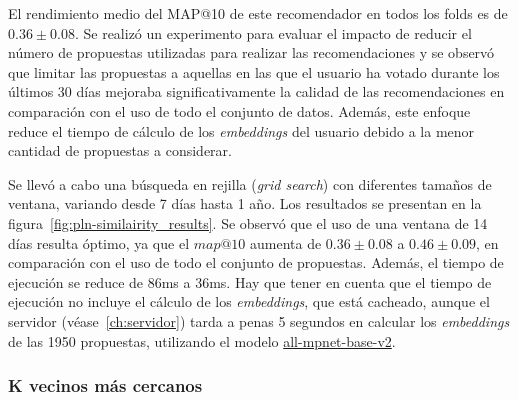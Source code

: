 El rendimiento medio del MAP@10 de este recomendador en todos los folds es de $0.36\pm 0.08$. Se realizó un experimento para evaluar el impacto de reducir el número de propuestas utilizadas para realizar las recomendaciones y se observó que limitar las propuestas a aquellas en las que el usuario ha votado durante los últimos 30 días mejoraba significativamente la calidad de las recomendaciones en comparación con el uso de todo el conjunto de datos. Además, este enfoque reduce el tiempo de cálculo de los \textit{embeddings} del usuario debido a la menor cantidad de propuestas a considerar.

Se llevó a cabo una búsqueda en rejilla (\textit{grid search}) con diferentes tamaños de ventana, variando desde 7 días hasta 1 año. Los resultados se presentan en la figura~\ref{fig:pln-similairity_results}. Se observó que el uso de una ventana de 14 días resulta óptimo, ya que el $map@10$ aumenta de $0.36\pm 0.08$ a $0.46\pm 0.09$, en comparación con el uso de todo el conjunto de propuestas. Además, el tiempo de ejecución se reduce de 86ms a 36ms. Hay que tener en cuenta que el tiempo de ejecución no incluye el cálculo de los \textit{embeddings}, que está cacheado, aunque el servidor (véase~\ref{ch:servidor}) tarda a penas 5 segundos en calcular los \textit{embeddings} de las 1950 propuestas, utilizando el modelo \url{all-mpnet-base-v2}.

\subsubsection{K vecinos más cercanos}


